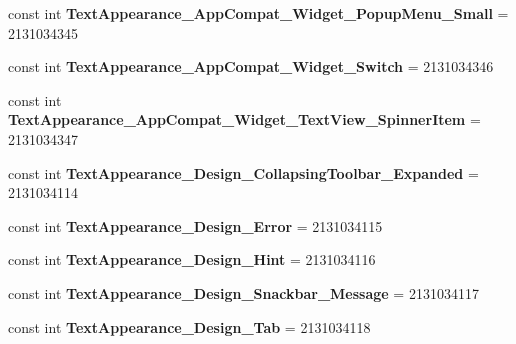 \begin{DoxyCompactItemize}
\item 
\hypertarget{classClient_1_1Droid_1_1Resource_1_1Style_a47eabc0a373e970f1534824f049c7803}{}const int {\bfseries Text\+Appearance\+\_\+\+App\+Compat\+\_\+\+Widget\+\_\+\+Popup\+Menu\+\_\+\+Small} = 2131034345\label{classClient_1_1Droid_1_1Resource_1_1Style_a47eabc0a373e970f1534824f049c7803}

\item 
\hypertarget{classClient_1_1Droid_1_1Resource_1_1Style_ae4981fc8f445d382e7df6d80f4c9ed46}{}const int {\bfseries Text\+Appearance\+\_\+\+App\+Compat\+\_\+\+Widget\+\_\+\+Switch} = 2131034346\label{classClient_1_1Droid_1_1Resource_1_1Style_ae4981fc8f445d382e7df6d80f4c9ed46}

\item 
\hypertarget{classClient_1_1Droid_1_1Resource_1_1Style_a9f09ded57a4c4fff7b224976d3dc784c}{}const int {\bfseries Text\+Appearance\+\_\+\+App\+Compat\+\_\+\+Widget\+\_\+\+Text\+View\+\_\+\+Spinner\+Item} = 2131034347\label{classClient_1_1Droid_1_1Resource_1_1Style_a9f09ded57a4c4fff7b224976d3dc784c}

\item 
\hypertarget{classClient_1_1Droid_1_1Resource_1_1Style_ae0806fc30a1b38766ebaaff7f21b7ee8}{}const int {\bfseries Text\+Appearance\+\_\+\+Design\+\_\+\+Collapsing\+Toolbar\+\_\+\+Expanded} = 2131034114\label{classClient_1_1Droid_1_1Resource_1_1Style_ae0806fc30a1b38766ebaaff7f21b7ee8}

\item 
\hypertarget{classClient_1_1Droid_1_1Resource_1_1Style_a2727d17262b50c584d798a3df06a323f}{}const int {\bfseries Text\+Appearance\+\_\+\+Design\+\_\+\+Error} = 2131034115\label{classClient_1_1Droid_1_1Resource_1_1Style_a2727d17262b50c584d798a3df06a323f}

\item 
\hypertarget{classClient_1_1Droid_1_1Resource_1_1Style_abfad6288b5f0b76ac47a506c1a3ed6f6}{}const int {\bfseries Text\+Appearance\+\_\+\+Design\+\_\+\+Hint} = 2131034116\label{classClient_1_1Droid_1_1Resource_1_1Style_abfad6288b5f0b76ac47a506c1a3ed6f6}

\item 
\hypertarget{classClient_1_1Droid_1_1Resource_1_1Style_a53fb1bd595822aabedcc9939cff3c1bf}{}const int {\bfseries Text\+Appearance\+\_\+\+Design\+\_\+\+Snackbar\+\_\+\+Message} = 2131034117\label{classClient_1_1Droid_1_1Resource_1_1Style_a53fb1bd595822aabedcc9939cff3c1bf}

\item 
\hypertarget{classClient_1_1Droid_1_1Resource_1_1Style_a044fd010e51123cb1707ee0dfc0e0e7a}{}const int {\bfseries Text\+Appearance\+\_\+\+Design\+\_\+\+Tab} = 2131034118\label{classClient_1_1Droid_1_1Resource_1_1Style_a044fd010e51123cb1707ee0dfc0e0e7a}


\end{DoxyCompactItemize}
